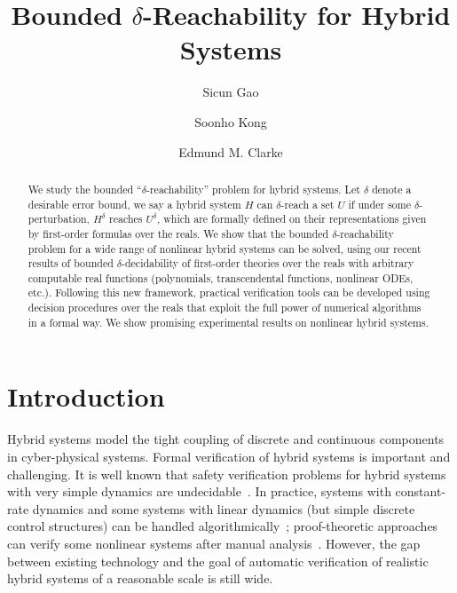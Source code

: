 \documentclass[envcountsect]{llncs}
\title{Bounded $\delta$-Reachability for Hybrid Systems}
\author{Sicun Gao \and Soonho Kong \and Edmund M. Clarke}
\institute{Carnegie Mellon University, Pittsburgh, PA 15213}
\begin{document}
\maketitle

\begin{abstract}
We study the bounded ``$\delta$-reachability'' problem for hybrid systems. Let
$\delta$ denote a desirable error bound, we say a hybrid system $H$ can
$\delta$-reach a set $U$ if under some $\delta$-perturbation, $H^{\delta}$
reaches $U^{\delta}$, which are formally defined on their representations given
by first-order formulas over the reals. We show that the bounded
$\delta$-reachability problem for a wide range of nonlinear hybrid systems can
be solved, using our recent results of bounded $\delta$-decidability of
first-order theories over the reals with arbitrary computable real functions
(polynomials, transcendental functions, nonlinear ODEs, etc.). Following this
new framework, practical verification
tools can be developed using decision procedures over the reals that exploit
the full power of numerical algorithms in a formal way. We show promising
experimental results on nonlinear hybrid systems. 

\end{abstract}

\section{Introduction}

Hybrid systems model the tight coupling of discrete and continuous components
in cyber-physical systems. Formal verification of hybrid systems is
important and challenging. It is well known that safety verification
problems for hybrid systems with very simple dynamics are
undecidable~\cite{DBLP:journals/tse/AlurHH96,DBLP:journals/jcss/HenzingerKPV98,
DBLP:journals/tcs/Bournez99}. In practice, systems
with constant-rate dynamics
and some systems with linear dynamics (but simple discrete control structures)
can be handled
algorithmically~\cite{DBLP:journals/tse/AlurHH96,lpw:sttt97,DBLP:conf/hybrid/ChutinanK99,DBLP:conf/hybrid/AsarinDMB00,DBLP:conf/cav/AsarinDM02,DBLP:conf/hybrid/GirardGM06,DBLP:conf/cav/GuernicG09}; proof-theoretic
approaches can verify some nonlinear systems after manual analysis~\cite{DBLP:journals/logcom/Platzer10,DBLP:conf/hybrid/Sankaranarayanan10}.
However, the gap between existing technology
and the goal of automatic verification of realistic hybrid systems of a
reasonable scale is still wide. 
\end{document}
